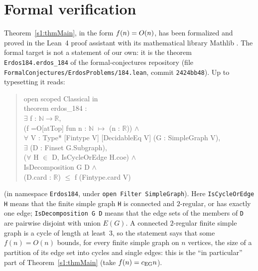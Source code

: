 \section{Formal verification}\label{s8:sec}
\begingroup\sloppy

Theorem~\ref{s1:thmMain}, in the form $f(n)=O(n)$, has been formalized and
proved in the Lean~4 proof assistant \cite{Lean4} with its mathematical library
Mathlib \cite{Mathlib}. The formal target is not a statement of our own: it is
the theorem \texttt{Erdos184.\allowbreak erdos\_184} of the formal-conjectures
repository \cite{FC} (file
\nolinkurl{FormalConjectures/ErdosProblems/184.lean}, commit
\texttt{2424bb48}). Up to typesetting it reads:
\begin{quote}\small\ttfamily
open scoped Classical in\\
theorem erdos\_184 :\\
\hspace*{1em}$\exists$ f : $\mathbb N\to\mathbb R$,\\
\hspace*{2em}(f =O[atTop] fun n : $\mathbb N$ $\mapsto$ (n : $\mathbb R$)) $\wedge$\\
\hspace*{2em}$\forall$ V : Type* [Fintype V] [DecidableEq V] (G : SimpleGraph V),\\
\hspace*{2em}$\exists$ (D : Finset G.Subgraph),\\
\hspace*{3em}($\forall$ H $\in$ D, IsCycleOrEdge H.coe) $\wedge$\\
\hspace*{3em}IsDecomposition G D $\wedge$\\
\hspace*{3em}(D.card : $\mathbb R$) $\le$ f (Fintype.card V)
\end{quote}
(in namespace \texttt{Erdos184}, under \texttt{open Filter SimpleGraph}).
Here \texttt{IsCycleOrEdge H} means that the finite simple graph \texttt{H} is
connected and $2$-regular, or has exactly one edge; \texttt{IsDecomposition G D}
means that the edge sets of the members of \texttt{D} are pairwise disjoint with
union $E(G)$. A connected $2$-regular finite simple graph is a cycle of length at
least~$3$, so the statement says that some $f(n)=O(n)$ bounds, for every finite
simple graph on $n$ vertices, the size of a partition of its edge set into cycles
and single edges: this is the ``in particular'' part of
Theorem~\ref{s1:thmMain} (take $f(n)=c_{\mathrm{EG}} n$).


